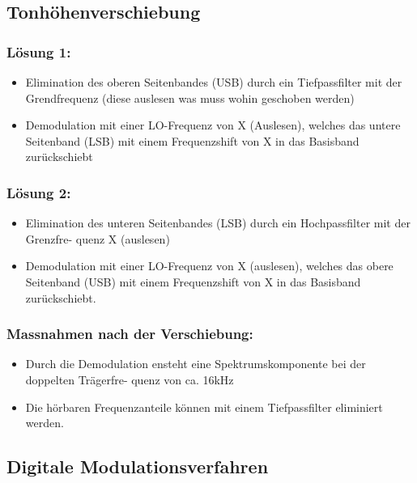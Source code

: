 \subsection{Tonhöhenverschiebung}
\subsubsection{Lösung 1:}
\begin{itemize}
    \item Elimination des oberen Seitenbandes (USB) durch ein Tiefpassfilter mit der Grendfrequenz (diese auslesen was muss wohin geschoben werden)
    \item Demodulation mit einer LO-Frequenz von X (Auslesen), welches das untere Seitenband (LSB) mit einem Frequenzshift von X in das Basisband zurückschiebt
\end{itemize}
\subsubsection{Lösung 2:}
\begin{itemize}
    \item Elimination des unteren Seitenbandes (LSB) durch ein Hochpassfilter mit der Grenzfre- quenz X (auslesen)
    \item Demodulation mit einer LO-Frequenz von X (auslesen), welches das obere Seitenband (USB) mit einem Frequenzshift von X in das Basisband zurückschiebt.
\end{itemize}
\subsubsection{Massnahmen nach der Verschiebung:}
\begin{itemize}
    \item Durch die Demodulation ensteht eine Spektrumskomponente bei der doppelten Trägerfre- quenz von ca. 16kHz
    \item Die hörbaren Frequenzanteile können mit einem Tiefpassfilter eliminiert werden.
\end{itemize}

\subsection{Digitale Modulationsverfahren}
